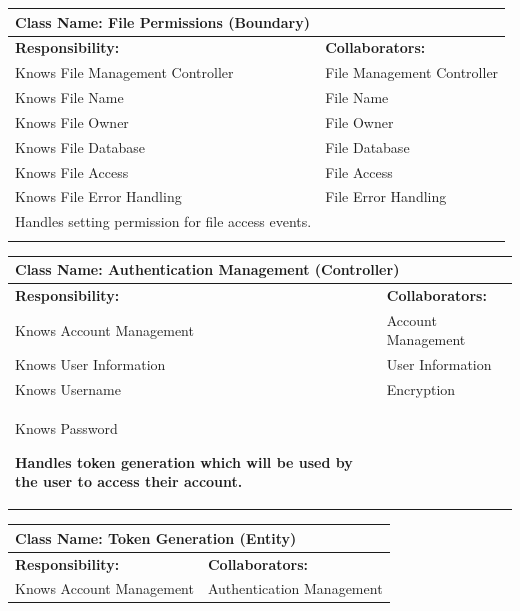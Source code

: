 \documentclass[]{article}
\begin{document}
\begin{itemize}
    	\begin{table}[ht]
		\centering
		\begin{tabular}{|p{7cm}|p{7cm}|}
		\hline 
		\multicolumn{2}{|l|}{\textbf{Class Name:} File Permissions (Boundary)} \\
		\hline
		\textbf{Responsibility:} & \textbf{Collaborators:} \\
		\hline
  			Knows File Management Controller & File Management Controller \\
			Knows File Name & File Name \\
			Knows File Owner & File Owner \\
			Knows File Database & File Database \\
			Knows File Access & File Access \\
			Knows File Error Handling & File Error Handling \\
			Handles setting permission for file access events. &\\
		\vspace{1in} & \\
		\hline
		\end{tabular}
	\end{table}

     	\begin{table}[ht]
		\centering
		\begin{tabular}{|p{7cm}|p{7cm}|}
		\hline 
		\multicolumn{2}{|l|}{\textbf{Class Name:} Authentication Management (Controller)} \\
		\hline
		\textbf{Responsibility:} & \textbf{Collaborators:} \\
		\hline
            Knows Account Management & Account Management\\
            
            Knows User Information & User Information\\
            Knows Username & Encryption\\
            Knows Password\
            
            \vspace{0.1in}
            \textbf{Handles token generation which will be used by the user to access their account.}

		\vspace{1in} & \\
		\hline
  
		\end{tabular}
	\end{table}
 

	\begin{table}[ht]
		\centering
		\begin{tabular}{|p{7cm}|p{7cm}|}
		\hline 
		 \multicolumn{2}{|l|}{\textbf{Class Name:} Token Generation (Entity)} \\
		\hline
		\textbf{Responsibility:} & \textbf{Collaborators:} \\
		\hline
            Knows Account Management & Authentication Management\\
            

\end{tabular}
\end{table}
\end{itemize}
\end{document}
